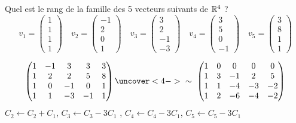 \begin{frame}
\begin{exemple}
Quel est le rang de la famille des 5 vecteurs suivants de $\mathbb{R}^4$ ?
$$
v_1=\begin{pmatrix}1 \\ 1 \\ 1 \\ 1\end{pmatrix} \quad
v_2=\begin{pmatrix}-1 \\ 2 \\ 0 \\ 1\end{pmatrix} \quad
v_3=\begin{pmatrix}3 \\ 2 \\ -1 \\ -3\end{pmatrix} \quad
v_4=\begin{pmatrix}3 \\ 5 \\ 0 \\ -1\end{pmatrix} \quad
v_5=\begin{pmatrix}3 \\ 8 \\ 1 \\ 1\end{pmatrix}$$

\pause

$$\begin{pmatrix}
1&-1&3&3&3\cr
1&2&2&5&8\cr
1&0&-1&0&1\cr
1&1&-3&-1&1 \cr
\end{pmatrix}
\uncover<4->{
\ \sim\ 
\begin{pmatrix}
1&0&0&0&0\cr
1&3&-1&2&5\cr
1&1&-4&-3&-2\cr
1&2&-6&-4&-2 \cr
\end{pmatrix}
}$$
\pause
$C_2 \leftarrow C_2+C_1$, 
$C_3\leftarrow C_3-3C_1$ , $C_4\leftarrow
C_4-3C_1$, 
$C_5\leftarrow C_5-3C_1$
\end{exemple}
\end{frame}

